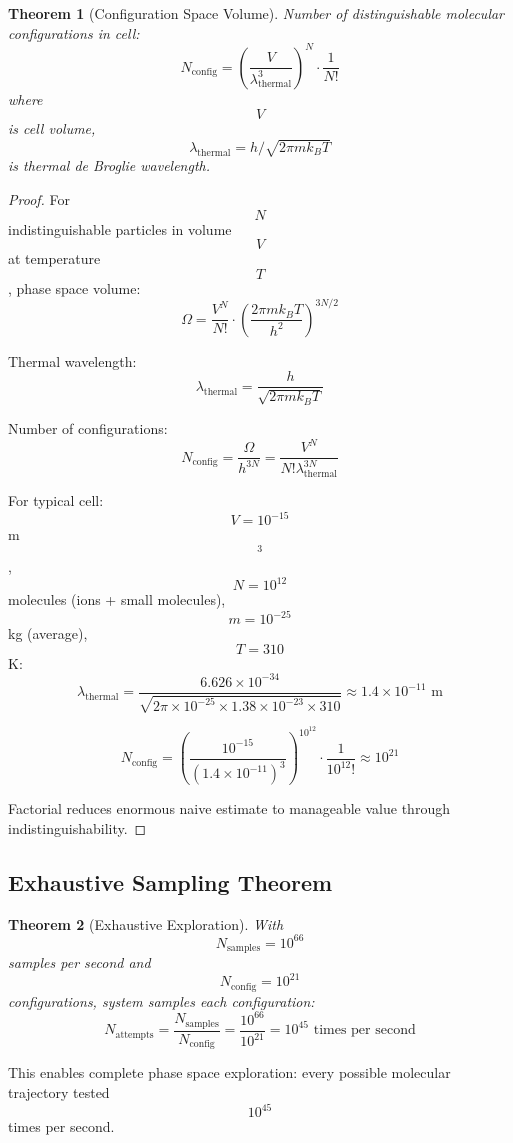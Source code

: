\documentclass[11pt,twocolumn,a4paper]{article}
\newtheorem{theorem}{Theorem}[section]
\theoremstyle{remark}
\begin{document}
\begin{theorem}[Configuration Space Volume]
\label{thm:config_volume}
Number of distinguishable molecular configurations in cell:
$$
N_{\mathrm{config}} = \left(\frac{V}{\lambda_{\mathrm{thermal}}^3}\right)^N \cdot \frac{1}{N!}
$$
where $$V$$ is cell volume, $$\lambda_{\mathrm{thermal}} = h/\sqrt{2\pi m k_B T}$$ is thermal de Broglie wavelength.
\end{theorem}

\begin{proof}
For $$N$$ indistinguishable particles in volume $$V$$ at temperature $$T$$, phase space volume:
$$
\Omega = \frac{V^N}{N!} \cdot \left(\frac{2\pi m k_B T}{h^2}\right)^{3N/2}
$$

Thermal wavelength:
$$
\lambda_{\mathrm{thermal}} = \frac{h}{\sqrt{2\pi m k_B T}}
$$

Number of configurations:
$$
N_{\mathrm{config}} = \frac{\Omega}{h^{3N}} = \frac{V^N}{N! \lambda_{\mathrm{thermal}}^{3N}}
$$

For typical cell: $$V = 10^{-15}$$ m$$^3$$, $$N = 10^{12}$$ molecules (ions + small molecules), $$m = 10^{-25}$$ kg (average), $$T = 310$$ K:
$$
\lambda_{\mathrm{thermal}} = \frac{6.626 \times 10^{-34}}{\sqrt{2\pi \times 10^{-25} \times 1.38 \times 10^{-23} \times 310}} \approx 1.4 \times 10^{-11} \text{ m}
$$

$$
N_{\mathrm{config}} = \left(\frac{10^{-15}}{(1.4 \times 10^{-11})^3}\right)^{10^{12}} \cdot \frac{1}{10^{12}!} \approx 10^{21}
$$

Factorial reduces enormous naive estimate to manageable value through indistinguishability.
\end{proof}

\subsection{Exhaustive Sampling Theorem}

\begin{theorem}[Exhaustive Exploration]
\label{thm:exhaustive_exploration}
With $$N_{\mathrm{samples}} = 10^{66}$$ samples per second and $$N_{\mathrm{config}} = 10^{21}$$ configurations, system samples each configuration:
$$
N_{\mathrm{attempts}} = \frac{N_{\mathrm{samples}}}{N_{\mathrm{config}}} = \frac{10^{66}}{10^{21}} = 10^{45} \text{ times per second}
$$
\end{theorem}

This enables complete phase space exploration: every possible molecular trajectory tested $$10^{45}$$ times per second.
\end{document}
